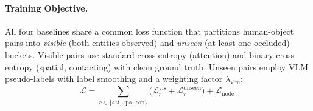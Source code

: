 \paragraph{Training Objective.}
\label{par:baseline_loss}
All four baselines share a common loss function that partitions human-object pairs into \emph{visible} (both entities observed) and \emph{unseen} (at least one occluded) buckets. Visible pairs use standard cross-entropy (attention) and binary cross-entropy (spatial, contacting) with clean ground truth. Unseen pairs employ VLM pseudo-labels with label smoothing and a weighting factor $\lambda_{\text{vlm}}$:
\begin{equation}
    \mathcal{L} = \sum_{r \in \{\text{att, spa, con}\}} \bigl(\mathcal{L}_{r}^{\text{vis}} + \mathcal{L}_{r}^{\text{unseen}}\bigr) + \mathcal{L}_{\text{node}}.
    \label{eq:baseline_loss}
\end{equation}
